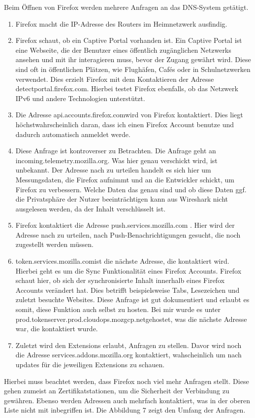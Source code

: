 \documentclass[12pt]{article}
\begin{document}
Beim Öffnen  von Firefox werden mehrere Anfragen an das DNS-System getätigt. 
\begin{enumerate}
	\item Firefox macht die IP-Adresse des Routers im Heimnetzwerk ausfindig. 
	\item Firefox schaut, ob ein Captive Portal vorhanden ist. \glqq Ein Captive Portal ist eine Webseite, die der Benutzer eines öffentlich zugänglichen Netzwerks ansehen und mit ihr interagieren muss, bevor der Zugang gewährt wird.\grqq\cite{captiveportal-computerweekly} Diese sind oft in öffentlichen Plätzen, wie Flughäfen, Cafés oder in Schulnetzwerken verwendet. Dies erzielt Firefox mit dem Kontaktieren der Adresse \glq detectportal.firefox.com\grq. Hierbei testet Firefox ebenfalls, ob das Netzwerk IPv6 und andere Technologien unterstützt.\cite{captiveportal-firefox}
	\item Die Adresse \glq api.accounts.firefox.com\grq wird von Firefox kontaktiert. Dies liegt höchstwahrscheinlich daran, dass ich einen Firefox Account benutze und dadurch automatisch anmeldet werde.
	\item Diese Anfrage ist kontroverser zu Betrachten. Die Anfrage geht an \glq incoming.telemetry.mozilla.org\grq. Was hier genau verschickt wird, ist unbekannt. Der Adresse nach zu urteilen handelt es sich hier um Messungsdaten, die Firefox aufnimmt und an die Entwickler schickt, um Firefox zu verbessern. Welche Daten das genau sind und ob diese Daten ggf. die Privatsphäre der Nutzer beeinträchtigen kann aus Wireshark nicht ausgelesen werden, da der Inhalt verschlüsselt ist.
	\item Firefox kontaktiert die Adresse \glq push.services.mozilla.com \grq. Hier wird der Adresse nach zu urteilen, nach Push-Benachrichtigungen gesucht, die noch zugestellt werden müssen. 
	\item \glq token.services.mozilla.com\grq ist die nächste Adresse, die kontaktiert wird. Hierbei geht es um die Sync Funktionalität eines Firefox Accounts. Firefox schaut hier, ob sich der synchronisierte Inhalt innerhalb eines Firefox Accounts verändert hat. Dies betrifft beispielsweise Tabs, Lesezeichen und zuletzt besuchte Websites. Diese Anfrage ist gut dokumentiert und erlaubt es somit, diese Funktion auch selbst zu hosten.\cite{syncstorage-firefox} Bei mir wurde es unter \glq prod.tokenserver.prod.cloudops.mozgcp.net\grq gehostet, was die nächste Adresse war, die kontaktiert wurde.
	\item Zuletzt wird den Extensions erlaubt, Anfragen zu stellen. Davor wird noch die Adresse \glq services.addons.mozilla.org \grq kontaktiert, wahscheinlich um nach updates für die jeweiligen Extensions zu schauen.
\end{enumerate}
\newpage
	Hierbei muss beachtet werden, dass Firefox noch viel mehr Anfragen stellt. Diese gehen zumeist an Zertifikatstationen, um die Sicherheit der Verbindung zu gewähren. Ebenso werden Adressen auch mehrfach kontaktiert, was in der oberen Liste nicht mit inbegriffen ist. Die Abbildung 7 zeigt den Umfang der Anfragen.
	
\end{document}
